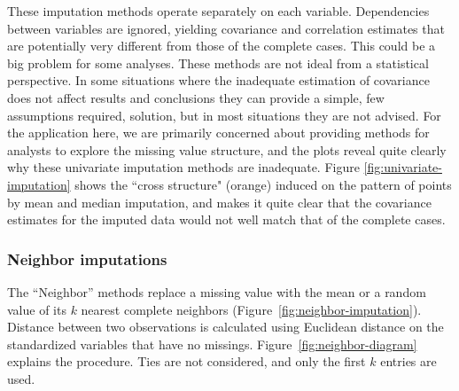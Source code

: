 \documentclass[article]{jss}
\begin{document}
These imputation methods operate separately on each variable.  Dependencies between variables are ignored, yielding covariance and correlation estimates that are potentially very different from those of the complete cases. This could be a big problem for some analyses. These methods are not ideal from a statistical perspective.  In some situations where the inadequate estimation of covariance does not affect results and conclusions they can provide a simple, few assumptions required, solution, but in most situations they are not advised. For the application here, we are primarily concerned about providing methods for analysts to explore the missing value structure, and the plots reveal quite clearly why these univariate imputation methods are inadequate. Figure \ref{fig:univariate-imputation} shows the ``cross structure" (orange) induced on the pattern of points by mean and median imputation, and makes it quite clear that the covariance estimates for the imputed data would not well match that of the complete cases. 

\subsubsection{Neighbor imputations}


The ``Neighbor'' methods replace a missing value with the mean or a random value of its $k$ nearest complete neighbors (Figure~\ref{fig:neighbor-imputation}). Distance between two observations is calculated using Euclidean distance on the standardized variables that have no missings. Figure~\ref{fig:neighbor-diagram} explains the procedure. Ties are not considered, and only the first $k$ entries are used. 
\end{document}
